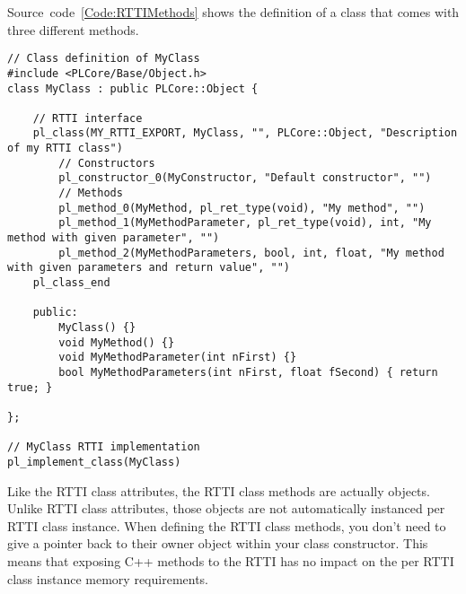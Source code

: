 Source~code~\ref{Code:RTTIMethods} shows the definition of a class that comes with three different methods.
\begin{lstlisting}[label=Code:RTTIMethods,caption={Definition of \ac{RTTI} class methods with parameters}]
// Class definition of MyClass
#include <PLCore/Base/Object.h>
class MyClass : public PLCore::Object {

	// RTTI interface
	pl_class(MY_RTTI_EXPORT, MyClass, "", PLCore::Object, "Description of my RTTI class")
		// Constructors
		pl_constructor_0(MyConstructor, "Default constructor", "")
		// Methods
		pl_method_0(MyMethod, pl_ret_type(void), "My method", "")
		pl_method_1(MyMethodParameter, pl_ret_type(void), int, "My method with given parameter", "")
		pl_method_2(MyMethodParameters, bool, int, float, "My method with given parameters and return value", "")
	pl_class_end

	public:
		MyClass() {}
		void MyMethod() {}
		void MyMethodParameter(int nFirst) {}
		bool MyMethodParameters(int nFirst, float fSecond) { return true; }

};

// MyClass RTTI implementation
pl_implement_class(MyClass)
\end{lstlisting}
Like the \ac{RTTI} class attributes, the \ac{RTTI} class methods are actually objects. Unlike \ac{RTTI} class attributes, those objects are not automatically instanced per \ac{RTTI} class instance. When defining the \ac{RTTI} class methods, you don't need to give a pointer back to their owner object within your class constructor. This means that exposing C++ methods to the \ac{RTTI} has no impact on the per \ac{RTTI} class instance memory requirements.

